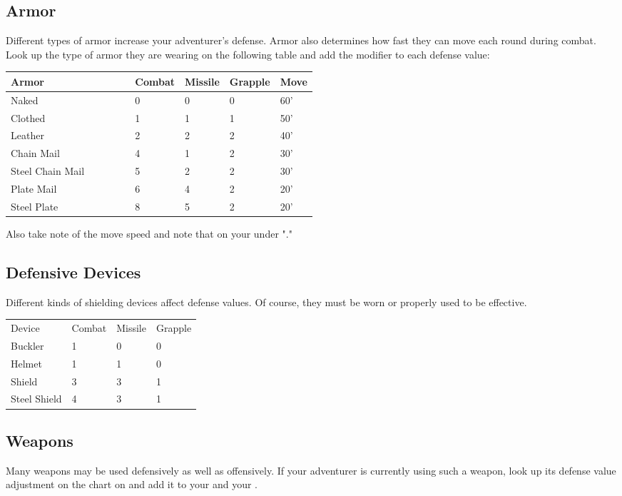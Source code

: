 \begin{multicols*}{2}
\subsection{Armor}
Different types of armor increase your adventurer's defense. Armor also determines how fast they can move each round during combat. Look up the type of armor they are wearing on the following table and add the modifier to each defense value:
\begin{normbox}
\begin{tabular}{@{}l p{0.125\linewidth} p{0.125\linewidth} p{0.125\linewidth} p{0.125\linewidth}}
\small
\textbf{Armor} & \textbf{Combat} & \textbf{Missile} & \textbf{Grapple} & \textbf{Move}\\
\midrule
Naked & 0 & 0 & 0 & 60'\\
Clothed & 1 & 1 & 1 & 50'\\
Leather & 2 & 2 & 2 & 40'\\
Chain Mail & 4 & 1 & 2 & 30'\\
Steel Chain Mail  & 5 & 2 & 2 & 30'\\
Plate Mail & 6 & 4 & 2 & 20'\\
Steel Plate & 8 & 5 & 2 & 20'\\
\end{tabular}
\end{normbox}
Also take note of the move speed and note that on your  under "."
\subsection{Defensive Devices}
Different kinds of shielding devices affect defense values. Of course, they must be worn or properly used to be effective.
\begin{normbox}
\begin{tabular}{l l l l}
Device & Combat & Missile & Grapple\\
Buckler & 1 & 0 & 0\\
Helmet & 1 & 1 & 0\\
Shield & 3 & 3 & 1\\
Steel Shield & 4 & 3 & 1\\
\end{tabular}
\end{normbox}
\subsection{Weapons}
Many weapons may be used defensively as well as offensively. If your adventurer is currently using such a weapon, look up its defense value adjustment on the  chart on  and add it to your \CDV and your \GDV.
\end{multicols*}